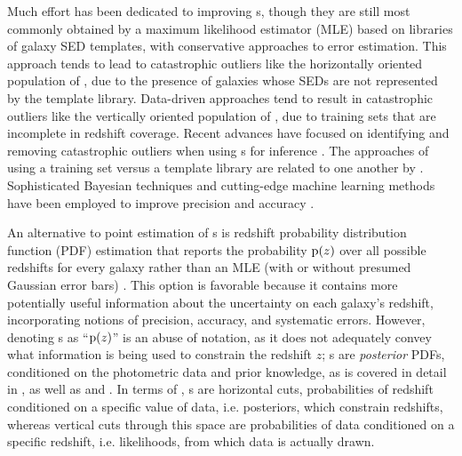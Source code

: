 Much effort has been dedicated to improving \pz s, though they are still most commonly obtained by a maximum likelihood estimator (MLE) based on libraries of galaxy SED templates, with conservative approaches to error estimation.
This approach tends to lead to catastrophic outliers like the horizontally oriented population of , due to the presence of galaxies whose SEDs are not represented by the template library.
Data-driven approaches tend to result in catastrophic outliers like the vertically oriented population of , due to training sets that are incomplete in redshift coverage.
Recent advances have focused on identifying and removing catastrophic outliers when using \pz s for 
inference \citep{Gorecki2014}.  
The approaches of using a training set versus a template library are related to one another by \citet{Budavari2009}.
Sophisticated Bayesian techniques and cutting-edge machine learning methods have been employed to improve precision \citep{Carliles2010} and accuracy \citep{sadeh_annz2:_2016}. 

An alternative to point estimation of \pz s is redshift probability distribution function (PDF) estimation that reports the probability $\mathrm{p}(z)$ over all possible redshifts for every galaxy rather than an MLE (with or without presumed Gaussian error bars) \citep{Koo1999}.  
This option is favorable because it contains more potentially useful information about the uncertainty on each galaxy's redshift, incorporating notions of precision, accuracy, and systematic errors.
However, denoting \pzpdf s as ``$\mathrm{p}(z)$'' is an abuse of notation, as it does not adequately convey what information is being used to constrain the redshift $z$; \pzpdf s are \textit{posterior} PDFs, conditioned on the photometric data and prior knowledge, as is covered in detail in , as well as  and .
In terms of , \pzpdf s are horizontal cuts, probabilities of redshift conditioned on a specific value of data, i.e. posteriors, which constrain redshifts, whereas vertical cuts through this space are probabilities of data conditioned on a specific redshift, i.e. likelihoods, from which data is actually drawn.


